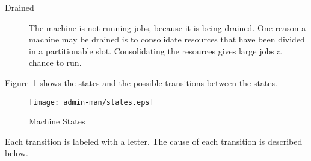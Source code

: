 \begin{description}
\item[Drained] The machine is not running jobs, because it is being
  drained.  One reason a machine may be drained is to consolidate
  resources that have been divided in a partitionable slot.
  Consolidating the resources gives large jobs a chance to run.

\end{description}

Figure~\ref{fig:machine-states} shows
the states and the possible transitions between the states.


\begin{figure}[hbt]
\centering
\texttt{[image: admin-man/states.eps]}
\caption{\label{fig:machine-states}Machine States}
\end{figure}

Each transition is labeled with a letter.
The cause of each transition is described below.



